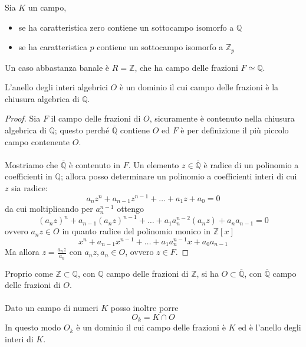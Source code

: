 \begin{proposizione}
	Sia $K$ un campo, 
	\begin{itemize}
		\item se ha caratteristica zero contiene un sottocampo isomorfo a $\mathbb{Q}$
		\item se ha caratteristica $p$ contiene un sottocampo isomorfo a $\mathbb{Z}_p$
	\end{itemize}
\end{proposizione}
\begin{esempio}
	Un caso abbastanza banale è $R=\mathbb{Z}$, che ha campo delle frazioni $F\simeq\mathbb{Q}$.
\end{esempio}
\begin{teorema}
	L'anello degli interi algebrici $O$ è un dominio il cui campo delle frazioni è la chiusura algebrica di $\mathbb{Q}$.
\end{teorema}
\begin{proof}
	Sia $F$ il campo delle frazioni di $O$, sicuramente è contenuto nella chiusura algebrica di $\mathbb{Q}$; questo perché $\overline{\mathbb{Q}}$ contiene $O$ ed $F$ è per definizione il più piccolo campo contenente $O$. \\ \\ Mostriamo che $\overline{\mathbb{Q}}$ è contenuto in $F$. Un elemento $z\in\overline{\mathbb{Q}}$ è radice di un polinomio a coefficienti in $\mathbb{Q}$; allora posso determinare un polinomio a coefficienti interi di cui $z$ sia radice:
	\begin{equation*}
	a_nz^n+a_{n-1}z^{n-1}+\dots+a_1z+a_0=0
	\end{equation*}
	da cui moltiplicando per $a_n^{n-1}$ ottengo
	\begin{equation*}
	(a_nz)^n+a_{n-1}(a_nz)^{n-1}+\dots+a_1a_n^{n-2}(a_nz)+a_na_{n-1}=0
	\end{equation*}
	ovvero $a_nz\in O$ in quanto radice del polinomio monico in $\mathbb{Z}[x]$
	\begin{equation*}
	x^n+a_{n-1}x^{n-1}+\dots+a_1a_n^{n-1}x+a_0a_{n-1}
	\end{equation*}
	Ma allora $z=\frac{a_nz}{a_n}$ con $a_nz,a_n\in O$, ovvero $z\in F$.
\end{proof}
\begin{osservazione}
	Proprio come $\mathbb{Z}\subset\mathbb{Q}$, con $\mathbb{Q}$ campo delle frazioni di $\mathbb{Z}$, si ha $O\subset\overline{\mathbb{Q}}$, con $\overline{\mathbb{Q}}$ campo delle frazioni di $O$. \\ \\ Dato un campo di numeri $K$ posso inoltre porre 
	\begin{equation*}
	O_k=K\cap O
	\end{equation*}
	In questo modo $O_k$ è un dominio il cui campo delle frazioni è $K$ ed è l'anello degli interi di $K$.
\end{osservazione}
